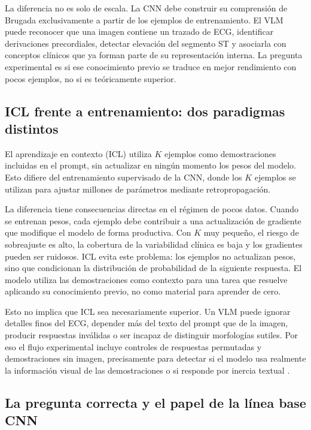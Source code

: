 La diferencia no es solo de escala. La CNN debe construir su comprensión de Brugada exclusivamente a partir de los ejemplos de entrenamiento. El VLM puede reconocer que una imagen contiene un trazado de ECG, identificar derivaciones precordiales, detectar elevación del segmento ST y asociarla con conceptos clínicos que ya forman parte de su representación interna. La pregunta experimental es si ese conocimiento previo se traduce en mejor rendimiento con pocos ejemplos, no si es teóricamente superior.

\subsection{ICL frente a entrenamiento: dos paradigmas distintos}

El aprendizaje en contexto (ICL) utiliza \(K\) ejemplos como demostraciones incluidas en el prompt, sin actualizar en ningún momento los pesos del modelo. Esto difiere del entrenamiento supervisado de la CNN, donde los \(K\) ejemplos se utilizan para ajustar millones de parámetros mediante retropropagación.

La diferencia tiene consecuencias directas en el régimen de pocos datos. Cuando se entrenan pesos, cada ejemplo debe contribuir a una actualización de gradiente que modifique el modelo de forma productiva. Con \(K\) muy pequeño, el riesgo de sobreajuste es alto, la cobertura de la variabilidad clínica es baja y los gradientes pueden ser ruidosos. ICL evita este problema: los ejemplos no actualizan pesos, sino que condicionan la distribución de probabilidad de la siguiente respuesta. El modelo utiliza las demostraciones como contexto para una tarea que resuelve aplicando su conocimiento previo, no como material para aprender de cero.

Esto no implica que ICL sea necesariamente superior. Un VLM puede ignorar detalles finos del ECG, depender más del texto del prompt que de la imagen, producir respuestas inválidas o ser incapaz de distinguir morfologías sutiles. Por eso el flujo experimental incluye controles de respuestas permutadas y demostraciones sin imagen, precisamente para detectar si el modelo usa realmente la información visual de las demostraciones o si responde por inercia textual \cite{chen2024,zhang2024mmicl}.

\subsection{La pregunta correcta y el papel de la línea base CNN}

